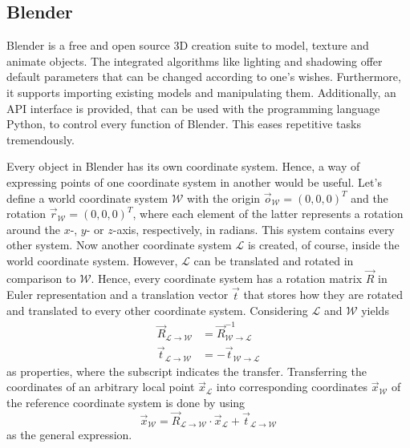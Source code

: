 \subsection{Blender}
\label{sec:software-blender}
Blender is a free and open source 3D creation suite to model, texture and animate objects.
The integrated algorithms like lighting and shadowing offer default parameters that can be changed according to one's wishes.
Furthermore, it supports importing existing models and manipulating them.
Additionally, an API interface is provided, that can be used with the programming language Python, to control every function of Blender.
This eases repetitive tasks tremendously.

Every object in Blender has its own coordinate system.
Hence, a way of expressing points of one coordinate system in another would be useful.
Let's define a world coordinate system $\mathcal{W}$ with the origin $\vec{o}_\mathcal{W} = (0,0,0)^T$ and the rotation $\vec{r}_{\mathcal{W}} = (0,0,0)^T$, where each element of the latter represents a rotation around the $x$-, $y$- or $z$-axis, respectively, in radians.
This system contains every other system.
Now another coordinate system $\mathcal{L}$ is created, of course, inside the world coordinate system.
However, $\mathcal{L}$ can be translated and rotated in comparison to $\mathcal{W}$.
Hence, every coordinate system has a rotation matrix $\vec{R}$ in Euler representation and a translation vector $\vec{t}$ that stores how they are rotated and translated to every other coordinate system.
Considering $\mathcal{L}$ and $\mathcal{W}$ yields
\begin{align}
	\vec{R}_{\mathcal{L} \rightarrow \mathcal{W}} &= \vec{R}_{\mathcal{W} \rightarrow \mathcal{L}}^{-1} \\
	\vec{t}_{\mathcal{L} \rightarrow \mathcal{W}} &= - \vec{t}_{\mathcal{W} \rightarrow \mathcal{L}}
\end{align}
as properties, where the subscript indicates the transfer.
Transferring the coordinates of an arbitrary local point $\vec{x}_{\mathcal{L}}$ into corresponding coordinates $\vec{x}_{\mathcal{W}}$ of the reference coordinate system is done by using
\begin{equation}
	\vec{x}_{\mathcal{W}} = \vec{R}_{\mathcal{L} \rightarrow \mathcal{W}} \cdot \vec{x}_{\mathcal{L}} + \vec{t}_{\mathcal{L} \rightarrow \mathcal{W}}
\end{equation}
as the general expression.